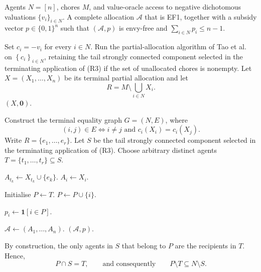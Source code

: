 \documentclass[sigconf,anonymous]{aamas}
\newcommand{\agents}{N}
\newcommand{\items}{M}
\newcommand{\cost}{c}
\newcommand{\set}[1]{\left\{#1\right\}}
\newcommand{\abs}[1]{\left\lvert#1\right\rvert}
\theoremstyle{acmplain}
\theoremstyle{acmdefinition}
\theoremstyle{acmplain}
\begin{document}
\begin{algorithm}[H]
\caption{EF1 allocation with at most one unit of subsidy per agent for negative dichotomous valuations}
\label{alg:main}
\begin{algorithmic}[1]
\Require Agents $N=[n]$, chores $M$, and value-oracle access to negative
dichotomous valuations $\{v_i\}_{i\in N}$.
\Ensure A complete allocation $\mathcal{A}$ that is EF1, together with a
subsidy vector $p\in\{0,1\}^n$ such that $(\mathcal{A},p)$ is envy-free and
$\sum_{i\in N}p_i\le n-1$.

\State Set $c_i=-v_i$ for every $i\in N$.
\State Run the partial-allocation algorithm of Tao et al.~\cite{tao2025existence} on $\set{\cost_i}_{i\in\agents}$, retaining the tail strongly connected component selected in the terminating application of  \textnormal{(R3)} if the set of unallocated chores is nonempty.
\State Let $X=(X_1,\dots,X_n)$ be its terminal partial allocation and let
\[
R=\items\setminus\bigcup_{i\in\agents}X_i .
       \]
    \State \Return $(X,\mathbf 0)$.
\EndIf

\State Construct the terminal equality graph $G=(\agents,E)$, where
       \[
       (i,j)\in E
       \iff
       i\neq j
       \text{ and }
       \cost_i(X_i)=\cost_i(X_j).
       \]
\State Write $R=\{e_1,\ldots,e_r\}$.
\State Let $S$ be the tail strongly connected component selected in the
       terminating application of \textnormal{(R3)}.
       \Comment{$r<\abs S$}
\State Choose arbitrary distinct agents
      $T=\{t_1,\ldots,t_r\}\subseteq S$.

    \State $A_{t_k}\gets X_{t_k}\cup\{e_k\}$.
\EndFor
{}
    \State $A_i\gets X_i$.
\EndFor

\State Initialise $P\gets T$.
    \State $P\gets P\cup\{i\}$.
\EndWhile

    \State $p_i\gets \mathbf{1}[i\in P]$.
\EndFor

\State $\mathcal{A}\gets(A_1,\ldots,A_n)$.
\State \Return $(\mathcal{A},p)$.
\end{algorithmic}
\end{algorithm}


By construction, the only agents in $S$ that belong to $P$ are the recipients in $T$. Hence,
\begin{equation}
\label{eq:Pstructure}
P\cap S=T,
\qquad\text{and consequently}\qquad
P\setminus T\subseteq N\setminus S.
\end{equation}
\end{document}
